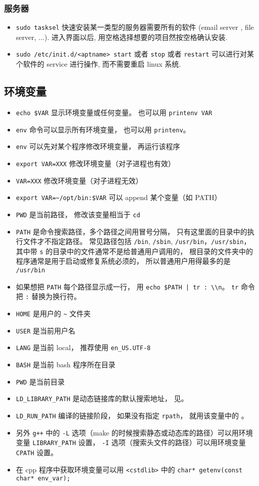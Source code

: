 \subsubsection{服务器}
\begin{itemize}
\item \verb`sudo tasksel` 快速安装某一类型的服务器需要所有的软件 (email server , file server, ...). 进入界面以后, 用空格选择想要的项目然按空格确认安装.
\item \verb`sudo /etc/init.d/<aptname> start` 或者 \verb`stop` 或者 \verb`restart` 可以进行对某个软件的 service 进行操作, 而不需要重启 linux 系统.
\end{itemize}

\subsection{环境变量}
\begin{itemize}
\item \verb`echo $VAR` 显示环境变量或任何变量。 也可以用 \verb`printenv VAR`
\item \verb`env` 命令可以显示所有环境变量， 也可以用 \verb`printenv`。
\item \verb`env` 可以先对某个程序修改环境变量， 再运行该程序
\item \verb`export VAR=XXX` 修改环境变量（对子进程也有效）
\item \verb`VAR=XXX` 修改环境变量（对子进程无效）
\item \verb`export VAR=~/opt/bin:$VAR` 可以 append 某个变量（如 PATH）
\item \verb`PWD` 是当前路径， 修改该变量相当于 \verb`cd`
\item \verb`PATH` 是命令搜索路径，多个路径之间用冒号分隔， 只有这里面的目录中的执行文件才不指定路径。 常见路径包括 \verb`/bin`, \verb`/sbin`, \verb`/usr/bin`，\verb`/usr/sbin`， 其中带 \verb`s` 的目录中的文件通常不是给普通用户调用的， 根目录的文件夹中的程序通常是用于启动或修复系统必须的， 所以普通用户用得最多的是 \verb`/usr/bin`
\item 如果想把 \verb`PATH` 每个路径显示成一行， 用 \verb`echo $PATH | tr : \\n`。 \verb`tr` 命令把 \verb`:` 替换为换行符。
\item \verb`HOME` 是用户的 \verb`~` 文件夹
\item \verb`USER` 是当前用户名
\item \verb`LANG` 是当前 local， 推荐使用 \verb`en_US.UTF-8`
\item \verb`BASH` 是当前 bash 程序所在目录
\item \verb`PWD` 是当前目录
\item \verb`LD_LIBRARY_PATH` 是动态链接库的默认搜索地址， 见。
\item \verb`LD_RUN_PATH` 编译的链接阶段， 如果没有指定 \verb`rpath`， 就用该变量中的 。
\item 另外 \verb`g++` 中的 \verb`-L` 选项（make 的时候搜索静态或动态库的路径）可以用环境变量 \verb`LIBRARY_PATH` 设置， \verb`-I` 选项（搜索头文件的路径）可以用环境变量 \verb`CPATH` 设置。
\item 在 cpp 程序中获取环境变量可以用 \verb`<cstdlib>` 中的 \verb`char* getenv(const char* env_var);`
\end{itemize}

